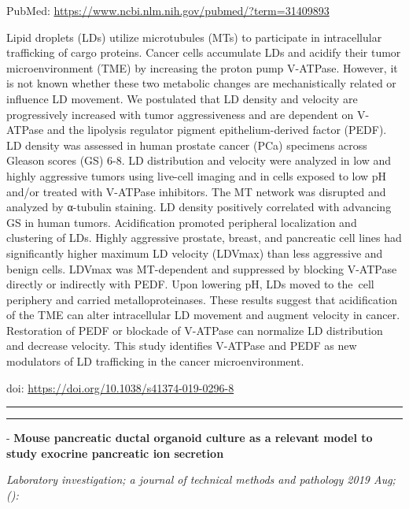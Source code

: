 \documentclass[]{article}
\begin{document}
PubMed: \url{https://www.ncbi.nlm.nih.gov/pubmed/?term=31409893}

Lipid droplets (LDs) utilize microtubules (MTs) to participate in
intracellular trafficking of cargo proteins. Cancer cells accumulate LDs
and acidify their tumor microenvironment (TME) by increasing the proton
pump V-ATPase. However, it is not known whether these two metabolic
changes are mechanistically related or influence LD movement. We
postulated that LD density and velocity are progressively increased with
tumor aggressiveness and are dependent on V-ATPase and the lipolysis
regulator pigment epithelium-derived factor (PEDF). LD density was
assessed in human prostate cancer (PCa) specimens across Gleason scores
(GS) 6-8. LD distribution and velocity were analyzed in low and highly
aggressive tumors using live-cell imaging and in cells exposed to low pH
and/or treated with V-ATPase inhibitors. The MT network was disrupted
and analyzed by α-tubulin staining. LD density positively correlated
with advancing GS in human tumors. Acidification promoted peripheral
localization and clustering of LDs. Highly aggressive prostate, breast,
and pancreatic cell lines had significantly higher maximum LD velocity
(LDVmax) than less aggressive and benign cells. LDVmax was MT-dependent
and suppressed by blocking V-ATPase directly or indirectly with PEDF.
Upon lowering pH, LDs moved to the~cell periphery and carried
metalloproteinases. These results suggest that acidification of the TME
can alter intracellular LD movement and augment velocity in cancer.
Restoration of PEDF or blockade of V-ATPase can normalize LD
distribution and decrease velocity. This study identifies V-ATPase and
PEDF as new modulators of LD trafficking in the cancer microenvironment.

doi: \url{https://doi.org/10.1038/s41374-019-0296-8}

{}

{}

\begin{center}\rule{0.5\linewidth}{\linethickness}\end{center}

\begin{center}\rule{0.5\linewidth}{\linethickness}\end{center}

 - \textbf{Mouse pancreatic ductal organoid culture as a relevant model
to study exocrine pancreatic ion secretion}

\emph{Laboratory investigation; a journal of technical methods and
pathology 2019 Aug;():}
\end{document}
